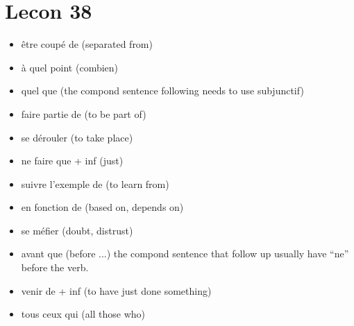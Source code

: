 \documentclass{book}
\begin{document}
\chapter{Lecon 38}
    \begin{itemize}
        \item être coupé de (separated from)
        \item à quel point (combien) %
        \item quel que (the compond sentence following needs to use subjunctif)
        \item faire partie de (to be part of)
        \item se dérouler (to take place)
        \item ne faire que + inf (just)
        \item suivre l'exemple de (to learn from)
        \item en fonction de (based on, depends on)
        \item se méfier (doubt, distrust)
        \item avant que (before ...) the compond sentence that follow up usually have ``ne'' before the verb.
        \item venir de + inf (to have just done something)
        \item tous ceux qui (all those who)
    \end{itemize}
\end{document}
